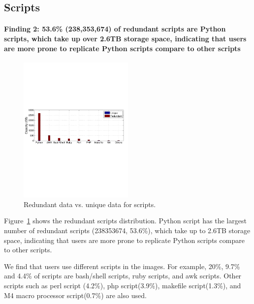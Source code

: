 
\subsection{Scripts}
\paragraph{Finding 2: 53.6\% (238,353,674) of redundant scripts are Python scripts, which take up over 2.6TB storage space, indicating that users are more prone to replicate Python scripts compare to other scripts}

\begin{figure}
	\centering
	\includegraphics[width=0.5\textwidth]{graphs/type-script-cap}
	\caption{Redundant data vs. unique data for scripts.
	}
	\label{fig:type-script}
\end{figure}

Figure~\ref{fig:type-script} shows the redundant scripts distribution. Python script has the largest number of redundant scripts (238353674, 53.6\%), which take up to 2.6TB storage space, indicating that users are more prone to replicate Python scripts compare to other scripts. 

We find that users use different scripts in the images. 
For example, 20\%, 9.7\% and 4.4\% of scripts are bash/shell scripts, ruby scripts, and awk scripts. Other scripts such as perl script (4.2\%), php script(3.9\%), makefile script(1.3\%), and M4 macro processor script(0.7\%) are also used.

